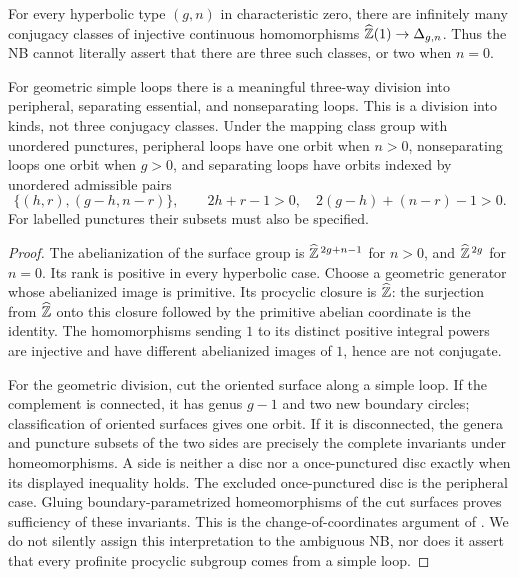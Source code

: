 \begin{proposition}\label{A6-three-classes}
For every hyperbolic type $(g,n)$ in characteristic zero, there are infinitely many conjugacy classes of injective continuous homomorphisms $\widehat{{\mathbb{Z}}}(1)\to\Delta_{g,n}$. Thus the NB cannot literally assert that there are three such classes, or two when $n=0$.

For geometric simple loops there is a meaningful three-way division into peripheral, separating essential, and nonseparating loops. This is a division into kinds, not three conjugacy classes. Under the mapping class group with unordered punctures, peripheral loops have one orbit when $n>0$, nonseparating loops one orbit when $g>0$, and separating loops have orbits indexed by unordered admissible pairs
\[
 \{(h,r),(g-h,n-r)\},\qquad
 2h+r-1>0,\quad 2(g-h)+(n-r)-1>0.
\]
For labelled punctures their subsets must also be specified.
\end{proposition}
\begin{proof}
The abelianization of the surface group is $\widehat{{\mathbb{Z}}}^{\,2g+n-1}$ for $n>0$, and $\widehat{{\mathbb{Z}}}^{\,2g}$ for $n=0$. Its rank is positive in every hyperbolic case. Choose a geometric generator whose abelianized image is primitive. Its procyclic closure is $\widehat{{\mathbb{Z}}}$: the surjection from $\widehat{{\mathbb{Z}}}$ onto this closure followed by the primitive abelian coordinate is the identity. The homomorphisms sending $1$ to its distinct positive integral powers are injective and have different abelianized images of $1$, hence are not conjugate.

For the geometric division, cut the oriented surface along a simple loop. If the complement is connected, it has genus $g-1$ and two new boundary circles; classification of oriented surfaces gives one orbit. If it is disconnected, the genera and puncture subsets of the two sides are precisely the complete invariants under homeomorphisms. A side is neither a disc nor a once-punctured disc exactly when its displayed inequality holds. The excluded once-punctured disc is the peripheral case. Gluing boundary-parametrized homeomorphisms of the cut surfaces proves sufficiency of these invariants. This is the change-of-coordinates argument of \cite[\S1.3]{FarbMargalit2012A567}. We do not silently assign this interpretation to the ambiguous NB, nor does it assert that every profinite procyclic subgroup comes from a simple loop.
\end{proof}

